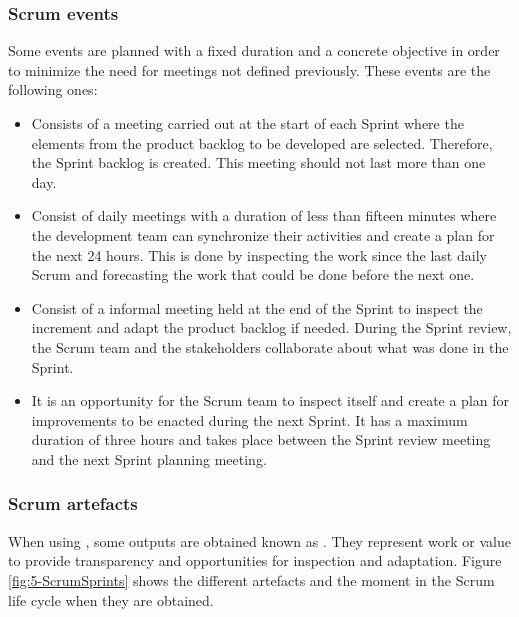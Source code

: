 \subsubsection{Scrum events}
Some events are planned with a fixed duration and a concrete objective in order to minimize the need for meetings not defined previously. These events are the following ones:

\begin{itemize}
	\item {} Consists of a meeting carried out at the start of each Sprint where the elements from the product backlog to be developed are selected. Therefore, the Sprint backlog is created. This meeting should not last more than one day.
	
	\item {} Consist of daily meetings with a duration of less than fifteen minutes where the development team can synchronize their activities and create a plan for the next 24 hours. This is done by inspecting the work since the last daily Scrum and forecasting the work that could be done before the next one.
	
	\item {} Consist of a informal meeting held at the end of the Sprint to inspect the increment and adapt the product backlog if needed. During the Sprint review, the Scrum team and the stakeholders collaborate about what was done in the Sprint.
	
	\item {} It is an opportunity for the Scrum team to inspect itself and create a plan for improvements to be enacted during the next Sprint. It has a maximum duration of three hours and takes place between the Sprint review meeting and the next Sprint planning meeting.
\end{itemize}


\subsubsection{Scrum artefacts}
When using , some outputs are obtained known as . They represent work or value to provide transparency and opportunities for inspection and adaptation. Figure \ref{fig:5-ScrumSprints} shows the different artefacts and the moment in the Scrum life cycle when they are obtained.

